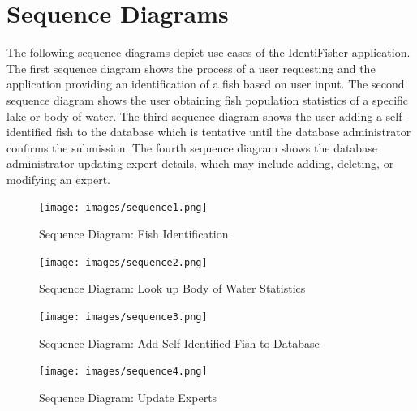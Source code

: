 \documentclass[]{article}
\begin{document}
\section{Sequence Diagrams}
\label{sec:sequence_diagrams}
The following sequence diagrams depict use cases of the IdentiFisher application. The first sequence diagram shows the process of a user requesting and the application providing an identification of a fish based on user input. The second sequence diagram shows the user obtaining fish population statistics of a specific lake or body of water. The third sequence diagram shows the user adding a self-identified fish to the database which is tentative until the database administrator confirms the submission. The fourth sequence diagram shows the database administrator updating expert details, which may include adding, deleting, or modifying an expert.
\begin{figure}[H]
	\texttt{[image: images/sequence1.png]}
	\caption{Sequence Diagram: Fish Identification}
\end{figure}
\begin{figure}[H]
	\texttt{[image: images/sequence2.png]}
	\caption{Sequence Diagram: Look up Body of Water Statistics}
\end{figure}
\begin{figure}[H]
	\texttt{[image: images/sequence3.png]}
	\caption{Sequence Diagram: Add Self-Identified Fish to Database}
\end{figure}
\begin{figure}[H]
	\begin{center}
	\texttt{[image: images/sequence4.png]}
	\caption{Sequence Diagram: Update Experts}
	\end{center}
\end{figure}
\end{document}
